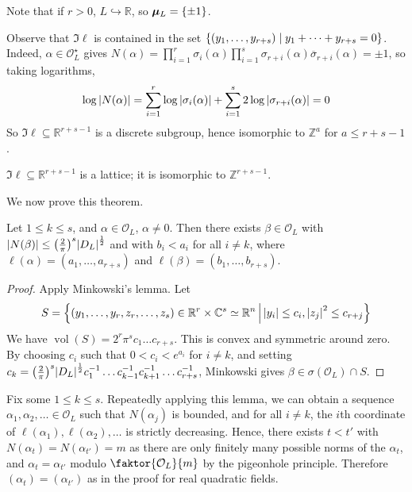 Note that if \( r > 0 \), \( L \hookrightarrow \mathbb R \), so \( \bm\mu_L = \qty{\pm 1} \).

Observe that \( \Im \ell \) is contained in the set \( \qty{(y_1, \dots, y_{r+s}) \mid y_1 + \dots + y_{r+s} = 0} \).
Indeed, \( \alpha \in \mathcal O_L^\star \) gives \( N(\alpha) = \prod_{i=1}^r \sigma_i(\alpha) \prod_{i=1}^s \sigma_{r+i}(\alpha) \overline\sigma_{r+i}(\alpha) = \pm 1 \), so taking logarithms,
\[ \log\abs{N(\alpha)} = \sum_{i=1}^r \log\abs{\sigma_i(\alpha)} + \sum_{i=1}^s 2\log\abs{\sigma_{r+i}(\alpha)} = 0 \]
So \( \Im \ell \subseteq \mathbb R^{r+s-1} \) is a discrete subgroup, hence isomorphic to \( \mathbb Z^a \) for \( a \leq r + s - 1 \).
\begin{theorem}
    \( \Im \ell \subseteq \mathbb R^{r+s-1} \) is a lattice; it is isomorphic to \( \mathbb Z^{r+s-1} \).
\end{theorem}
We now prove this theorem.
\begin{lemma}
    Let \( 1 \leq k \leq s \), and \( \alpha \in \mathcal O_L \), \( \alpha \neq 0 \).
    Then there exists \( \beta \in \mathcal O_L \) with \( \abs{N(\beta)} \leq \qty(\frac{2}{\pi})^s \abs{D_L}^{\frac{1}{2}} \) and with \( b_i < a_i \) for all \( i \neq k \), where \( \ell(\alpha) = (a_1, \dots, a_{r+s}) \) and \( \ell(\beta) = (b_1, \dots, b_{r+s}) \).
\end{lemma}
\begin{proof}
    Apply Minkowski's lemma.
    Let
    \[ S = \qty{(y_1, \dots, y_r, z_r, \dots, z_s) \in \mathbb R^r \times \mathbb C^s \simeq \mathbb R^n \,\middle|\,\abs{y_i} \leq c_i, \abs{z_j}^2 \leq c_{r+j}} \]
    We have \( \operatorname{vol}(S) = 2^r \pi^s c_1 \dots c_{r+s} \).
    This is convex and symmetric around zero.
    By choosing \( c_i \) such that \( 0 < c_i < e^{a_i} \) for \( i \neq k \), and setting \( c_k = \qty(\frac{2}{\pi})^s \abs{D_L}^{\frac{1}{2}} c_1^{-1} \dots c_{k-1}^{-1} c_{k+1}^{-1} \dots c_{r+s}^{-1} \), Minkowski gives \( \beta \in \sigma(\mathcal O_L) \cap S \).
\end{proof}
Fix some \( 1 \leq k \leq s \).
Repeatedly applying this lemma, we can obtain a sequence \( \alpha_1, \alpha_2, \dots \in \mathcal O_L \) such that \( N(\alpha_j) \) is bounded, and for all \( i \neq k \), the \( i \)th coordinate of \( \ell(\alpha_1), \ell(\alpha_2), \dots \) is strictly decreasing.
Hence, there exists \( t < t' \) with \( N(\alpha_t) = N(\alpha_{t'}) = m \) as there are only finitely many possible norms of the \( \alpha_t \), and \( \alpha_t = \alpha_{t'} \) modulo \( \faktor{\mathcal O_L}{m} \) by the pigeonhole principle.
Therefore \( (\alpha_t) = (\alpha_{t'}) \) as in the proof for real quadratic fields.

